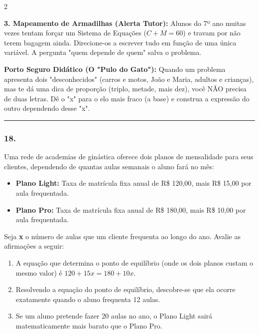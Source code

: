 \begin{multicols*}{2}
\begin{tcolorbox}[colback=CorTitUm!5, colframe=CorTitUm, boxrule=1pt, arc=4pt, left=6pt, right=6pt, top=6pt, bottom=6pt]
    \textbf{3. Mapeamento de Armadilhas (Alerta Tutor):} Alunos do 7º ano muitas vezes tentam forçar um Sistema de Equações ($C + M = 60$) e travam por não terem bagagem ainda. Direcione-os a escrever tudo em função de uma única variável. A pergunta "quem depende de quem" salva o problema.
    \end{tcolorbox}
    \vspace{0.15cm}
    
    \begin{boxexplicacao}
    \textbf{Porto Seguro Didático (O "Pulo do Gato"):} Quando um problema apresenta dois "desconhecidos" (carros e motos, João e Maria, adultos e crianças), mas te dá uma dica de proporção (triplo, metade, mais dez), você NÃO precisa de duas letras. Dê o "x" para o elo mais fraco (a base) e construa a expressão do outro dependendo desse "x". 
    \end{boxexplicacao}
\fi

\par\vspace{\espacoQuestao}


\noindent\textcolor{CorLinha}{\rule{\linewidth}{0.5pt}} 
\par\vspace{\espacoPreQuestao}
\subsubsection*{18.} 
\begin{enunciadoLiteral}
Uma rede de academias de ginástica oferece dois planos de mensalidade para seus clientes, dependendo de quantas aulas semanais o aluno fará no mês:

\begin{itemize}[itemsep=\espacoAlt]
\item \textbf{Plano Light:} Taxa de matrícula fixa anual de R\$ 120,00, mais R\$ 15,00 por aula frequentada.
\item \textbf{Plano Pro:} Taxa de matrícula fixa anual de R\$ 180,00, mais R\$ 10,00 por aula frequentada.
\end{itemize}

Seja \textbf{x} o número de aulas que um cliente frequenta ao longo do ano. Avalie as afirmações a seguir:

\begin{enumerate}[label=\Roman*., itemsep=\espacoAlt]
\item A equação que determina o ponto de equilíbrio (onde os dois planos custam o mesmo valor) é $120 + 15x = 180 + 10x$.
\item Resolvendo a equação do ponto de equilíbrio, descobre-se que ela ocorre exatamente quando o aluno frequenta 12 aulas.
\item Se um aluno pretende fazer 20 aulas no ano, o Plano Light sairá matematicamente mais barato que o Plano Pro.
\end{enumerate}


\end{enunciadoLiteral}
\end{multicols*}
